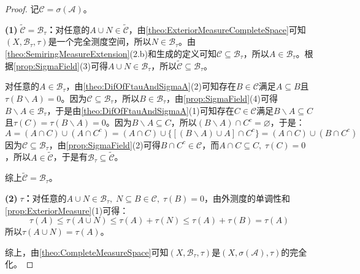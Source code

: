 \begin{proof}
	记$\mathscr{C}=\sigma(\mathscr{A})$。\par
	\textbf{(1)$\;\tilde{\mathscr{C}}=\mathscr{B}_\tau$：}对任意的$A\cup N\in\tilde{\mathscr{C}}$，由\cref{theo:ExteriorMeasureCompleteSpace}可知$(X,\mathscr{B}_\tau,\tau)$是一个完全测度空间，所以$N\in\mathscr{B}_\tau$。由\cref{theo:SemiringMeasureExtension}(2.b)和生成的定义可知$\mathscr{C}\subseteq\mathscr{B}_\tau$，所以$A\in\mathscr{B}_\tau$。根据\cref{prop:SigmaField}(3)可得$A\cup N\in\mathscr{B}_\tau$，所以$\tilde{\mathscr{C}}\subseteq\mathscr{B}_\tau$。\par
	对任意的$A\in\mathscr{B}_\tau$，由\cref{theo:DifOfFtauAndSigmaA}(2)可知存在$B\in\mathscr{C}$满足$A\subseteq B$且$\tau(B\backslash A)=0$。因为$\mathscr{C}\subseteq\mathscr{B}_\tau$，所以$B\in\mathscr{B}_\tau$，由\cref{prop:SigmaField}(4)可得$B\backslash A\in\mathscr{B}_\tau$，于是由\cref{theo:DifOfFtauAndSigmaA}(1)可知存在$C\in\mathscr{C}$满足$B\backslash A\subseteq C$且$\tau(C)=\tau(B\backslash A)=0$。因为$B\backslash A\subseteq C$，所以$(B\backslash A)\cap C^c=\varnothing$，于是：
	\begin{equation*}
		A=(A\cap C)\cup(A\cap C^c)=(A\cap C)\cup\{[(B\backslash A)\cup A]\cap C^c\}=(A\cap C)\cup(B\cap C^c)
	\end{equation*}
	因为$\mathscr{C}\subseteq\mathscr{B}_\tau$，由\cref{prop:SigmaField}(2)可得$B\cap C^c\in\mathscr{C}$，而$A\cap C\subseteq C,\;\tau(C)=0$，所以$A\in\tilde{\mathscr{C}}$，于是有$\mathscr{B}_\tau\subseteq\tilde{\mathscr{C}}$。\par
	综上$\tilde{\mathscr{C}}=\mathscr{B}_\tau$。\par
	\textbf{(2)$\;\tau$：}对任意的$A\cup N\in\mathscr{B}_\tau,\;N\subseteq B\in\mathscr{C},\;\tau(B)=0$，由外测度的单调性和\cref{prop:ExteriorMeasure}(1)可得：
	\begin{equation*}
		\tau(A)\leqslant\tau(A\cup N)\leqslant\tau(A)+\tau(N)\leqslant\tau(A)+\tau(B)=\tau(A)
	\end{equation*}
	所以$\tau(A\cup N)=\tau(A)$。\par
	综上，由\cref{theo:CompleteMeasureSpace}可知$(X,\mathscr{B}_\tau,\tau)$是$(X,\sigma(\mathscr{A}),\tau)$的完全化。
\end{proof}

